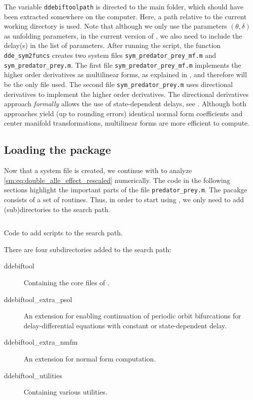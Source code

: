 \newcommand\pathToDDEBifToolDemos{./ddebiftooldemofiles/VII}
\inputminted[firstline=18, lastline=50]{MATLAB}{\pathToDDEBifToolDemos/predator_prey/gen_sym_predator_prey.m}
The variable \texttt{ddebiftoolpath} is directed to the \DDEBIFTOOL main
folder, which should have been extracted somewhere on the computer. Here, a path
relative to the current working directory is used. Note that although we only
use the parameters $(\theta,\delta)$ as unfolding parameters, in the current
version of \DDEBIFTOOL, we also need to include the delay(s) in the list of
parameters. After running the script, the function \texttt{dde_sym2funcs}
creates two system files \texttt{sym_predator_prey_mf.m} and \texttt{sym_predator_prey.m}.
The first file \texttt{sym_predator_prey_mf.m} implements the higher order derivatives
as multilinear forms, as explained in \cite[Section 6]{Switching2019}, and therefore will be the only file used.
The second file \texttt{sym_predator_prey.m}
uses directional derivatives to implement the higher order derivatives. The
directional derivatives approach \emph{formally} allows the use of
state-dependent delays, see \cite{Sieber@2017}. Although both approaches yield
(up to rounding errors) identical normal form coefficients and center manifold
transformations, multilinear forms are more efficient to compute.

\subsection{Loading the \DDEBIFTOOL package}
\label{sm:sec:loading_DDE-BIFTool}
Now that a system file is created, we continue with \DDEBIFTOOL to analyze
\cref{sm:eq:double_alle_effect_rescaled} numerically. The code in the following
sections highlight the important parts of the file \texttt{predator_prey.m}.
The pacakge \DDEBIFTOOL consists of a set of \MATLAB routines. Thus, in order to start
using \DDEBIFTOOL, we only need to add \DDEBIFTOOL (sub)directories to the search
path.
\begin{listing}[h!]
\inputminted[firstline=17, lastline=25]{MATLAB}{\pathToDDEBifToolDemos/predator_prey/predator_prey.m}
\caption{Code to add \DDEBIFTOOL scripts to the search path.}
\label{sm:lst:searchpath}
\end{listing}
There are four subdirectories added to the search path:
\par
\medskip
\begin{description}
\item[ddebiftool] Containing the core files of \DDEBIFTOOL.
\item[ddebiftool\_extra\_psol] An extension for enabling continuation of periodic orbit bifurcations for delay-differential equations with constant or state-dependent delay.
\item[ddebiftool\_extra\_nmfm] An extension for normal form computation.
\item[ddebiftool\_utilities] Containing various utilities.
\end{description}

